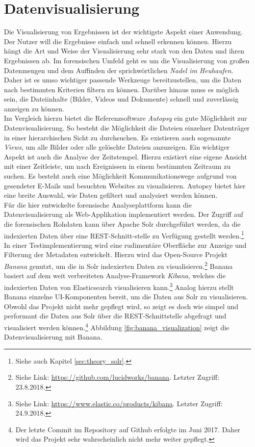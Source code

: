 \chapter{Datenvisualisierung}
\label{ch:data_visualization}

Die Visualisierung von Ergebnissen ist der wichtigste Aspekt einer Anwendung. Der Nutzer will die Ergebnisse einfach und schnell erkennen können. Hierzu hängt die Art und Weise der Visualisierung sehr stark von den Daten und ihren Ergebnissen ab. Im forensischen Umfeld geht es um die Visualisierung von großen Datenmengen und dem Auffinden der sprichwörtlichen \textit{Nadel im Heuhaufen}. Daher ist es umso wichtiger passende Werkzeuge bereitzustellen, um die Daten nach bestimmten Kriterien filtern zu können. Darüber hinaus muss es möglich sein, die Dateiinhalte (Bilder, Videos und  Dokumente) schnell und zuverlässig anzeigen zu können.\\

\noindent
Im Vergleich hierzu bietet die Referenzsoftware \textit{Autopsy} ein gute Möglichkeit zur Datenvisualisierung. So besteht die Möglichkeit die Dateien einzelner Datenträger in einer hierarchischen Sicht zu durchsuchen. Es existieren auch sogenannte \textit{Views}, um alle Bilder oder alle gelöschte Dateien anzuzeigen. Ein wichtiger Aspekt ist auch die Analyse der Zeitstempel. Hierzu existiert eine eigene Ansicht mit einer Zeitleiste, um nach Ereignissen in einem bestimmten Zeitraum zu suchen. Es besteht auch eine Möglichkeit Kommunikationswege aufgrund von gesendeter E-Mails und besuchten Websites zu visualisieren. Autopsy bietet hier eine breite Auswahl, wie Daten gefiltert und analysiert werden können.\\

\noindent
Für die hier entwickelte forensische Analyseplattform kann die Datenvisualisierung als Web-Applikation implementiert werden. Der Zugriff auf die forensischen Rohdaten kann über Apache Solr durchgeführt werden, da die indexierten Daten über eine REST-Schnitt-stelle zu Verfügung gestellt werden.\footnote{Siehe auch Kapitel \ref{sec:theory_solr}.}\\

\noindent
In einer Testimplementierung wird eine rudimentäre Oberfläche zur Anzeige und Filterung der Metadaten entwickelt. Hierzu wird das Open-Source Projekt \textit{Banana} genutzt, um die in Solr indexierten Daten zu visualisieren.\footnote{Siehe Link: \url{https://github.com/lucidworks/banana}. Letzter Zugriff: 23.8.2018.} Banana basiert auf dem weit verbreiteten Analyse-Framework \textit{Kibana}, welches die indexierten Daten von Elasticsearch visualisieren kann.\footnote{Siehe Link: \url{https://www.elastic.co/products/kibana}. Letzter Zugriff: 24.9.2018.} Analog hierzu stellt Banana einzelne UI-Komponenten bereit, um die Daten aus Solr zu visualisieren. Obwohl das Projekt nicht mehr gepflegt wird, so zeigt es doch wie simpel und performant die Daten aus Solr über die REST-Schnittstelle abgefragt und visualisiert werden können.\footnote{Der letzte Commit im Repository auf Github erfolgte im Juni 2017. Daher wird das Projekt sehr wahrscheinlich nicht mehr weiter gepflegt.}
Abbildung \ref{fig:banana_visualization} zeigt die Datenvisualisierung mit Banana.


